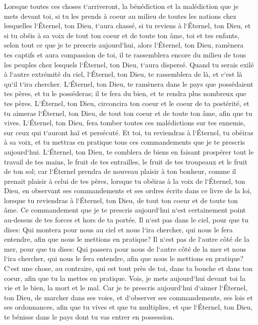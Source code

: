 \verse Lorsque toutes ces choses t`arriveront, la bénédiction et la malédiction que je mets devant toi, si tu les prends à coeur au milieu de toutes les nations chez lesquelles l`Éternel, ton Dieu, t`aura chassé, 
\verse si tu reviens à l`Éternel, ton Dieu, et si tu obéis à sa voix de tout ton coeur et de toute ton âme, toi et tes enfants, selon tout ce que je te prescris aujourd`hui, 
\verse alors l`Éternel, ton Dieu, ramènera tes captifs et aura compassion de toi, il te rassemblera encore du milieu de tous les peuples chez lesquels l`Éternel, ton Dieu, t`aura dispersé. 
\verse Quand tu serais exilé à l`autre extrémité du ciel, l`Éternel, ton Dieu, te rassemblera de là, et c`est là qu`il t`ira chercher. 
\verse L`Éternel, ton Dieu, te ramènera dans le pays que possédaient tes pères, et tu le posséderas; il te fera du bien, et te rendra plus nombreux que tes pères. 
\verse L`Éternel, ton Dieu, circoncira ton coeur et le coeur de ta postérité, et tu aimeras l`Éternel, ton Dieu, de tout ton coeur et de toute ton âme, afin que tu vives. 
\verse L`Éternel, ton Dieu, fera tomber toutes ces malédictions sur tes ennemis, sur ceux qui t`auront haï et persécuté. 
\verse Et toi, tu reviendras à l`Éternel, tu obéiras à sa voix, et tu mettras en pratique tous ces commandements que je te prescris aujourd`hui. 
\verse L`Éternel, ton Dieu, te comblera de biens en faisant prospérer tout le travail de tes mains, le fruit de tes entrailles, le fruit de tes troupeaux et le fruit de ton sol; car l`Éternel prendra de nouveau plaisir à ton bonheur, comme il prenait plaisir à celui de tes pères, 
\verse lorsque tu obéiras à la voix de l`Éternel, ton Dieu, en observant ses commandements et ses ordres écrits dans ce livre de la loi, lorsque tu reviendras à l`Éternel, ton Dieu, de tout ton coeur et de toute ton âme. 
\verse Ce commandement que je te prescris aujourd`hui n`est certainement point au-dessus de tes forces et hors de ta portée. 
\verse Il n`est pas dans le ciel, pour que tu dises: Qui montera pour nous au ciel et nous l`ira chercher, qui nous le fera entendre, afin que nous le mettions en pratique? 
\verse Il n`est pas de l`autre côté de la mer, pour que tu dises: Qui passera pour nous de l`autre côté de la mer et nous l`ira chercher, qui nous le fera entendre, afin que nous le mettions en pratique? 
\verse C`est une chose, au contraire, qui est tout près de toi, dans ta bouche et dans ton coeur, afin que tu la mettes en pratique. 
\verse Vois, je mets aujourd`hui devant toi la vie et le bien, la mort et le mal. 
\verse Car je te prescris aujourd`hui d`aimer l`Éternel, ton Dieu, de marcher dans ses voies, et d`observer ses commandements, ses lois et ses ordonnances, afin que tu vives et que tu multiplies, et que l`Éternel, ton Dieu, te bénisse dans le pays dont tu vas entrer en possession. 
